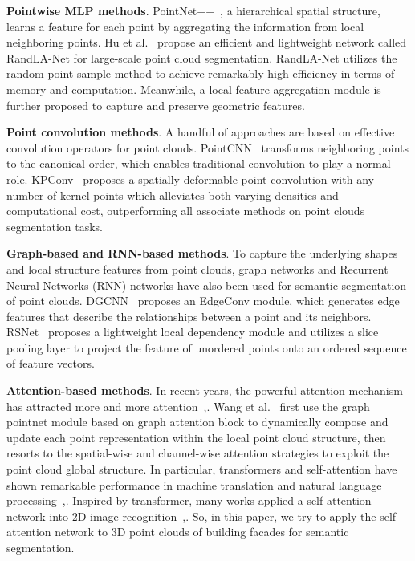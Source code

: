 \documentclass[review]{elsarticle}
\begin{document}
 \textbf{Pointwise MLP methods}. PointNet++~\cite{qi2017pointnet++}, a hierarchical spatial structure, learns a feature for each point by aggregating the information from local neighboring points. Hu et al.~\cite{hu2020randla} propose an efficient and lightweight network called RandLA-Net for large-scale point cloud segmentation. RandLA-Net utilizes the random point sample method to achieve remarkably high efficiency in terms of memory and computation. Meanwhile, a local feature aggregation module is further proposed to capture and preserve geometric features.

\textbf{Point convolution methods}. A handful of approaches are based on effective convolution operators for point clouds. PointCNN~\cite{li2018pointcnn} transforms neighboring points to the canonical order, which enables traditional convolution to play a normal role. KPConv~\cite{thomas2019kpconv} proposes a spatially deformable point convolution with any number of kernel points which alleviates both varying densities and computational cost, outperforming all associate methods on point clouds segmentation tasks.

\textbf{Graph-based and RNN-based methods}. To capture the underlying shapes and local structure features from point clouds, graph networks and Recurrent Neural Networks (RNN) networks have also been used for semantic segmentation of point clouds. DGCNN~\cite{2018Dynamic} proposes an EdgeConv module, which generates edge features that describe the relationships between a point and its neighbors. RSNet~\cite{2018Recurrent} proposes a lightweight local dependency module and utilizes a slice pooling layer to project the feature of unordered points onto an ordered sequence of feature vectors.

\textbf{Attention-based methods}. In recent years, the powerful attention mechanism has attracted more and more attention~\cite{Wang_2019_CVPR},\cite{feng2020point}. Wang et al.~\cite{wang2019exploiting} first use the graph pointnet module based on graph attention block to dynamically compose and update each point representation within the local point cloud structure, then resorts to the spatial-wise and channel-wise attention strategies to exploit the point cloud global structure. In particular, transformers and self-attention have shown remarkable performance in machine translation and natural language processing~\cite{vaswani2017attention},\cite{wu2019pay}. Inspired by transformer, many works applied a self-attention network into 2D image recognition~\cite{ramachandran2019stand},\cite{hu2019local}. So, in this paper, we try to apply the self-attention network to 3D point clouds of building facades for semantic segmentation.
\end{document}
